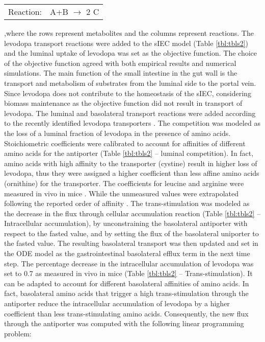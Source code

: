 \begin{center}
  \begin{tabular}{cc}
  Reaction: & A+B $\rightarrow$ 2 C  \\
  \end{tabular}
\end{center}

,where the rows represent metabolites and the columns represent reactions.
The levodopa transport reactions were added to the sIEC model (Table \ref{tbl:tbls2}) and the luminal uptake of levodopa was set as the objective function. The choice of the objective function agreed with both empirical results and numerical simulations. The main function of the small intestine in the gut wall is the transport and metabolism of substrates from the luminal side to the portal vein. Since levodopa does not contribute to the homeostasis of the sIEC, considering biomass maintenance as the objective function did not result in transport of levodopa. The luminal and basolateral transport reactions were added according to the recently identified levodopa transporters \cite{camargo2014molecular}. 
The competition was modeled as the loss of a luminal fraction of levodopa in the presence of amino acids. Stoichiometric coefficients were calibrated to account for affinities of different amino acids for the antiporter (Table \ref{tbl:tbls2} – luminal competition). In fact, amino acids with high affinity to the transporter (cystine) result in higher loss of levodopa, thus they were assigned a higher coefficient than less affine amino acids (ornithine) for the transporter. The coefficients for leucine and arginine were measured in vivo in mice \cite{camargo2014molecular}. While the unmeasured values were extrapolated following the reported order of affinity \cite{verrey2000glycoprotein}.
The trans-stimulation was modeled as the decrease in the flux through cellular accumulation reaction (Table \ref{tbl:tbls2} – Intracellular accumulation), by unconstraining the basolateral antiporter with respect to the fasted value, and by setting the flux of the basolateral uniporter to the fasted value. The resulting basolateral transport was then updated and set in the ODE model as the gastrointestinal basolateral efflux term in the next time step. The percentage decrease in the intracellular accumulation of levodopa was set to 0.7 as measured in vivo in mice \cite{camargo2014molecular} (Table \ref{tbl:tbls2} – Trans-stimulation). It can be adapted to account for different basolateral affinities of amino acids. In fact, basolateral amino acids that trigger a high trans-stimulation through the antiporter reduce the intracellular accumulation of levodopa by a higher coefficient than less trans-stimulating amino acids. Consequently, the new flux through the antiporter was computed with the following linear programming problem:
